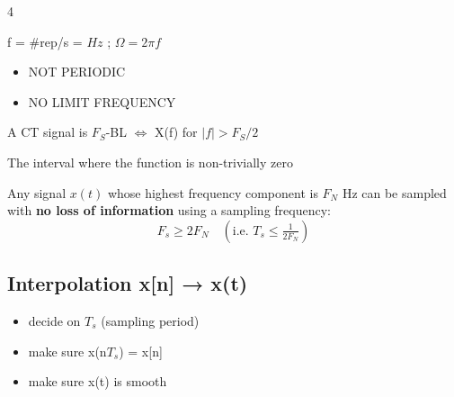 \documentclass[8pt,a4paper,landscape]{extarticle}
\begin{document}
\begin{multicols*}{4}
\begin{prop}[title=Real-world frequency]
f = $\#$rep/s = $Hz$ ; $\Omega = 2\pi f$
\end{prop}

\begin{thm}[title=CTFT (more info in cs)]
\begin{itemize}
  \item NOT PERIODIC
  \item NO LIMIT FREQUENCY
\end{itemize}
\end{thm}

\begin{defn}[title=BandLimited (BL) functions]
A CT signal is $F_S$-BL $\Leftrightarrow$ X(f) for $|f|>F_S/2$
\end{defn}

\begin{defn}[title=Support of a function]
The interval where the function is non-trivially zero
\end{defn}

\begin{thm}[title=Sampling theorem (Shannon--Nyquist)]
Any signal $x(t)$ whose highest frequency component is $F_N$ Hz can be sampled with \textbf{no loss of information} using a sampling frequency:
\[F_s \ge 2F_N \quad \left(\text{i.e.\ } T_s \le \tfrac{1}{2F_N}\right)\]
\end{thm}

\subsection{Interpolation x[n] → x(t)}
\begin{prop}[title=Interpolation requirement]
\begin{itemize}
  \item decide on $T_s$ (sampling period)
  \item make sure x(n$T_s$) = x[n]
  \item make sure x(t) is smooth
\end{itemize}
\end{prop}

\begin{prop}[title=Interpolations pros and cons]
\\
\end{prop}


\end{multicols*}
\end{document}
